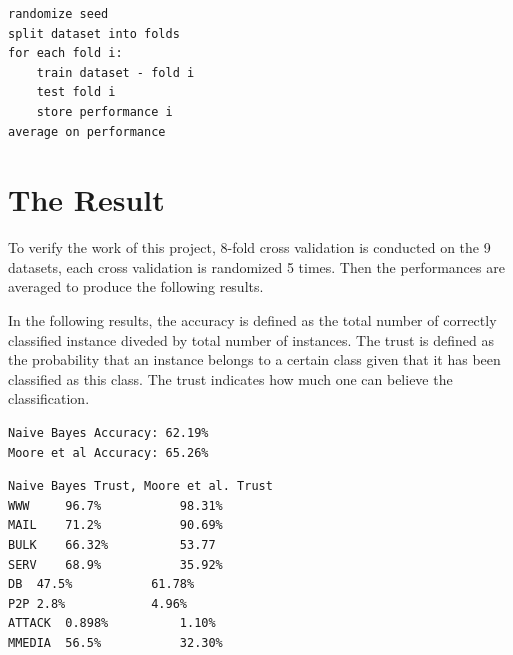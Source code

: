 \documentclass[a4paper,12pt]{article}
\begin{document}
\singlespacing
\begin{verbatim}
randomize seed 
split dataset into folds
for each fold i:
    train dataset - fold i 
    test fold i
    store performance i 
average on performance
\end{verbatim}
\doublespacing

\section{The Result}
\label{sec:result}
To verify the work of this project, 8-fold cross validation is conducted on the 9 datasets, each cross validation is randomized 5 times. Then the performances are averaged to produce the following results.

In the following results, the accuracy is defined as the total number of correctly classified instance diveded by total number of instances. The trust is defined as the probability that an instance belongs to a certain class given that it has been classified as this class. The trust indicates how much one can believe the classification.

\singlespacing
\begin{verbatim}
Naive Bayes Accuracy: 62.19%
Moore et al Accuracy: 65.26%
\end{verbatim}

\begin{verbatim}
Naive Bayes Trust, Moore et al. Trust
WWW 	96.7%			98.31%
MAIL	71.2%			90.69%
BULK	66.32%			53.77
SERV	68.9%			35.92%
DB	47.5%			61.78%
P2P	2.8%			4.96%
ATTACK	0.898%			1.10%
MMEDIA	56.5%			32.30%
\end{verbatim}
\doublespacing
\end{document}
